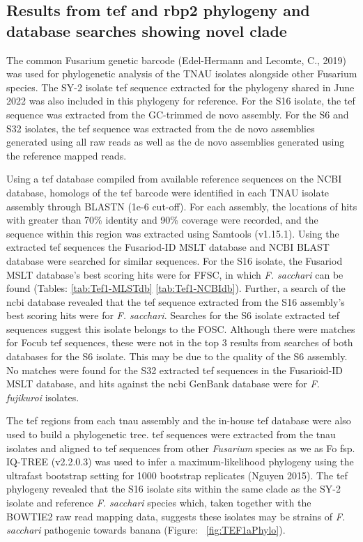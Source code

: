 \subsection{Results from \acf{tef} and \acf{rbp2} phylogeny and database searches showing novel clade}

The common Fusarium genetic barcode (Edel-Hermann and Lecomte, C., 2019) was used for phylogenetic analysis of the TNAU isolates alongside other Fusarium species. The SY-2 isolate \ac{tef} sequence extracted for the phylogeny shared in June 2022 was also included in this phylogeny for reference. For the S16 isolate, the \ac{tef} sequence was extracted from the GC-trimmed de novo assembly. For the S6 and S32 isolates, the \ac{tef} sequence was extracted from the de novo assemblies generated using all raw reads as well as the de novo assemblies generated using the reference mapped reads. 

Using a \ac{tef} database compiled from available reference sequences on the NCBI database, homologs of the \ac{tef} barcode were identified in each TNAU isolate assembly through BLASTN (1e-6 cut-off). For each assembly, the locations of hits with greater than 70\% identity and 90\% coverage were recorded, and the sequence within this region was extracted using Samtools (v1.15.1). Using the extracted \ac{tef} sequences the Fusariod-ID MSLT database and NCBI BLAST database were searched for similar sequences. For the S16 isolate, the Fusariod MSLT database's best scoring hits were for \ac{FFSC}, in which \textit{F. sacchari} can be found (Tables: \ref{tab:Tef1-MLSTdb} \ref{tab:Tef1-NCBIdb}). Further, a search of the \ac{ncbi} database revealed that the \ac{tef} sequence extracted from the S16 assembly's best scoring hits were for \textit{F. sacchari}. Searches for the S6 isolate extracted \ac{tef} sequences suggest this isolate belongs to the \ac{FOSC}. Although there were matches for \ac{Focub} \ac{tef} sequences, these were not in the top 3 results from searches of both databases for the S6 isolate. This may be due to the quality of the S6 assembly. No matches were found for the S32 extracted \ac{tef} sequences in the Fusarioid-ID MSLT database, and hits against the \ac{ncbi} GenBank database were for \textit{F. fujikuroi} isolates. 

\bigskip

\bigskip

The \ac{tef} regions from each \ac{tnau} assembly and the in-house \ac{tef} database were also used to build a phylogenetic tree. \Ac{tef} sequences were extracted from the \ac{tnau} isolates and aligned to \ac{tef} sequences from other \textit{Fusarium} species as we as \ac{Fo} \ac{fsp}. IQ-TREE (v2.2.0.3) was used to infer a maximum-likelihood phylogeny using the ultrafast bootstrap setting for 1000 bootstrap replicates (Nguyen 2015). The \ac{tef} phylogeny revealed that the  S16 isolate sits within the same clade as the SY-2 isolate and reference \textit{F. sacchari} species which, taken together with the BOWTIE2 raw read mapping data, suggests these isolates may be strains of \textit{F. sacchari} pathogenic towards banana (Figure: ~\ref{fig:TEF1aPhylo}). 

